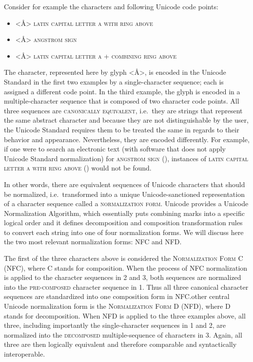 Consider for example the characters and following Unicode code points:
\begin{itemize}
	\def\labelenumi{\arabic{enumi}.} 
	\item <Å> \textsc{latin capital letter a with ring above}  
	\item <Å> \textsc{angstrom sign} 
	\item <Å> \textsc{latin capital letter a} 
	+ \textsc{combining ring above} 
\end{itemize}

The character, represented here by glyph <Å>, is encoded in the Unicode Standard
in the first two examples by a single-character sequence; each is assigned a
different code point. In the third example, the glyph is encoded in a
multiple-character sequence that is composed of two character code points. All
three sequences are \textsc{canonically equivalent}, i.e.~they are strings that
represent the same abstract character and because they are not distinguishable
by the user, the Unicode Standard requires them to be treated the same in
regards to their behavior and appearance. Nevertheless, they are encoded
differently. For example, if one were to search an electronic text (with
software that does not apply Unicode Standard normalization) for
\textsc{angstrom sign} (), instances of \textsc{latin capital letter a
with ring above} () would not be found.

In other words, there are equivalent sequences of Unicode characters that should
be normalized, i.e.~transformed into a unique Unicode-sanctioned representation
of a character sequence called a \textsc{normalization form}. Unicode provides a
Unicode Normalization Algorithm, which essentially puts combining marks
into a specific logical order and it defines decomposition and composition
transformation rules to convert each string into one of four normalization
forms. We will discuss here the two most relevant normalization forms: NFC and
NFD.\@

The first of the three characters above is considered the \textsc{Normalization
Form C (NFC)}, where \textsc{C} stands for composition. When the process of NFC
normalization is applied to the character sequences in 2 and 3, both sequences
are normalized into the \textsc{pre-composed} character sequence in 1. Thus all
three canonical character sequences are standardized into one composition form
in NFC.\@The other central Unicode normalization form is the
\textsc{Normalization Form D (NFD)}, where \textsc{D} stands for decomposition.
When NFD is applied to the three examples above, all three, including
importantly the single-character sequences in 1 and 2, are normalized into the
\textsc{decomposed} multiple-sequence of characters in 3. Again, all three are
then logically equivalent and therefore comparable and syntactically
interoperable.


